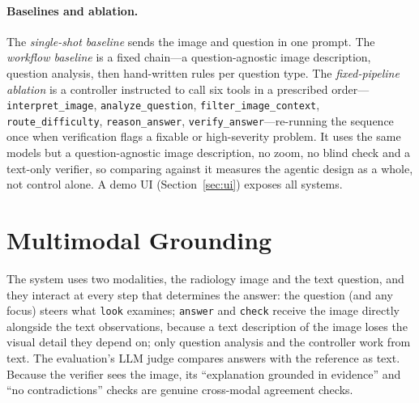 \documentclass{article}
\begin{document}
\paragraph{Baselines and ablation.} The \emph{single-shot baseline} sends the image and question in one prompt. The
\emph{workflow baseline} is a fixed chain---a question-agnostic image description, question analysis, then
hand-written rules per question type. The \emph{fixed-pipeline ablation} is a controller instructed to call six tools in a prescribed
order---\texttt{interpret\_image}, \texttt{analyze\_question}, \texttt{filter\_image\_context},
\texttt{route\_difficulty}, \texttt{reason\_answer}, \texttt{verify\_answer}---re-running the sequence once when
verification flags a fixable or high-severity problem. It uses the same models but a question-agnostic image description, no zoom, no
blind check and a text-only verifier, so comparing against it measures the agentic design as a whole, not control
alone. A demo UI (Section~\ref{sec:ui}) exposes all systems.

\section{Multimodal Grounding}
The system uses two modalities, the radiology image and the text question, and they interact at every step that
determines the answer: the question (and any focus) steers what \texttt{look} examines; \texttt{answer} and
\texttt{check} receive the image directly alongside the text observations, because a text description of the image
loses the visual detail they depend on; only question analysis and the controller work from text. The evaluation's
LLM judge compares answers with the reference as text. Because the verifier sees the image, its
``explanation grounded in evidence'' and ``no contradictions'' checks are genuine cross-modal agreement checks.

\end{document}
